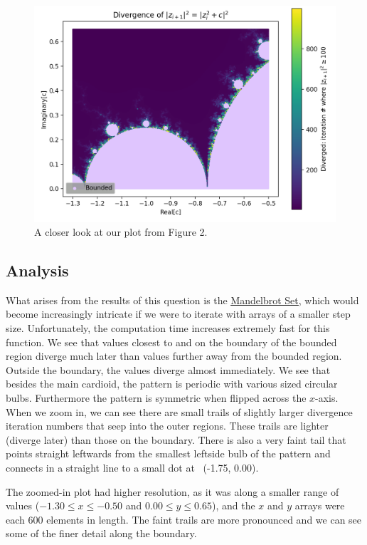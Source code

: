 \documentclass[12pt]{article}
\begin{document}
\begin{figure}
    \centering
    \includegraphics[scale=0.73]{Q1plot2_CITA200HA2.png}
    \caption{A closer look at our plot from Figure 2.}
    \label{fig:my_label}
\end{figure}

\pagebreak 
\subsection{Analysis}

What arises from the results of this question is the \href{https://en.wikipedia.org/wiki/Mandelbrot_set}{\color{blue}\uline{Mandelbrot Set}}, which would become increasingly intricate if we were to iterate with arrays of a smaller step size. Unfortunately, the computation time increases extremely fast for this function. We see that values closest to and on the boundary of the bounded region diverge much later than values further away from the bounded region. Outside the boundary, the values diverge almost immediately. We see that besides the main cardioid, the pattern is periodic with various sized circular bulbs. Furthermore the pattern is symmetric when flipped across the $x$-axis. When we zoom in, we can see there are small trails of slightly larger divergence iteration numbers that seep into the outer regions. These trails are lighter (diverge later) than those on the boundary. There is also a very faint tail that points straight leftwards from the smallest leftside bulb of the pattern and connects in a straight line to a small dot at ~(-1.75, 0.00). 

The zoomed-in plot had higher resolution, as it was along a smaller range of values ($-1.30 \leq x \leq -0.50$ and $0.00 \leq y \leq 0.65$), and the $x$ and $y$ arrays were each 600 elements in length. The faint trails are more pronounced and we can see some of the finer detail along the boundary.
\end{document}
